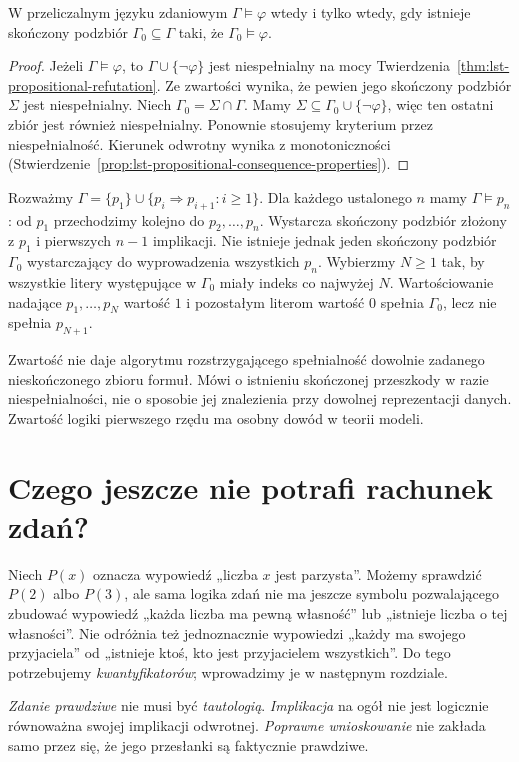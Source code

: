 \begin{wniosek}
\label{cor:lst-propositional-finite-support}
W przeliczalnym języku zdaniowym $\Gamma\models\varphi$
wtedy i tylko wtedy, gdy istnieje skończony podzbiór
$\Gamma_0\subseteq\Gamma$ taki, że $\Gamma_0\models\varphi$.
\end{wniosek}
\begin{proof}
Jeżeli $\Gamma\models\varphi$, to
$\Gamma\cup\{\neg\varphi\}$ jest niespełnialny na mocy
Twierdzenia~\ref{thm:lst-propositional-refutation}.
Ze zwartości wynika, że pewien jego skończony podzbiór
$\Sigma$ jest niespełnialny. Niech $\Gamma_0=\Sigma\cap\Gamma$.
Mamy $\Sigma\subseteq\Gamma_0\cup\{\neg\varphi\}$,
więc ten ostatni zbiór jest również niespełnialny.
Ponownie stosujemy kryterium przez niespełnialność.
Kierunek odwrotny wynika z monotoniczności
(Stwierdzenie~\ref{prop:lst-propositional-consequence-properties}).
\end{proof}

\begin{przyklad}
\label{ex:lst-propositional-chain}
Rozważmy $\Gamma=\{p_1\}\cup\{p_i\Rightarrow p_{i+1}:i\geq1\}$.
Dla każdego ustalonego $n$ mamy $\Gamma\models p_n$:
od $p_1$ przechodzimy kolejno do $p_2,\ldots,p_n$.
Wystarcza skończony podzbiór złożony z $p_1$ i pierwszych
$n-1$ implikacji. Nie istnieje jednak jeden skończony
podzbiór $\Gamma_0$ wystarczający do wyprowadzenia wszystkich $p_n$.
Wybierzmy $N\geq1$ tak, by wszystkie litery występujące
w $\Gamma_0$ miały indeks co najwyżej $N$.
Wartościowanie nadające $p_1,\ldots,p_N$ wartość $1$
i pozostałym literom wartość $0$ spełnia $\Gamma_0$,
lecz nie spełnia $p_{N+1}$.
\end{przyklad}
Zwartość nie daje algorytmu rozstrzygającego spełnialność
dowolnie zadanego nieskończonego zbioru formuł.
Mówi o istnieniu skończonej przeszkody w razie niespełnialności,
nie o sposobie jej znalezienia przy dowolnej reprezentacji danych.
Zwartość logiki pierwszego rzędu ma osobny dowód
w teorii modeli.

\section{Czego jeszcze nie potrafi rachunek zdań?}\label{sec:why-quantifiers}
Niech $P(x)$ oznacza wypowiedź „liczba $x$ jest parzysta”.
Możemy sprawdzić $P(2)$ albo $P(3)$, ale sama logika zdań
nie ma jeszcze symbolu pozwalającego zbudować wypowiedź
„każda liczba ma pewną własność” lub „istnieje liczba
o tej własności”. Nie odróżnia też jednoznacznie wypowiedzi
„każdy ma swojego przyjaciela” od „istnieje ktoś,
kto jest przyjacielem wszystkich”. Do tego potrzebujemy
\emph{kwantyfikatorów}; wprowadzimy je w następnym rozdziale.

\begin{uwaga}
\emph{Zdanie prawdziwe} nie musi być \emph{tautologią}.
\emph{Implikacja} na ogół nie jest logicznie równoważna
swojej implikacji odwrotnej.
\emph{Poprawne wnioskowanie} nie zakłada samo przez się,
że jego przesłanki są faktycznie prawdziwe.
\end{uwaga}
